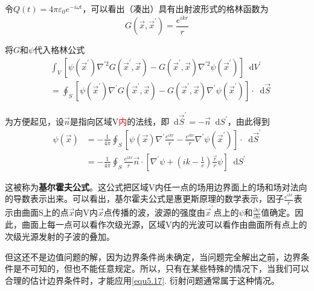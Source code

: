 \documentclass[UTF8]{ctexart}
\newcommand*{\dif}{\mathop{}\!\mathrm{d}}
\newcommand{\red}{\textcolor{red}}
\begin{document}
\noindent 令$Q(t) = 4 \pi \varepsilon_0 e^{-i \omega t}$，可以看出（凑出）具有出射波形式的格林函数为
\begin{equation}
    G(\vec{x},\vec{x}^{\prime}) = \frac{e^{ikr}}{r}
\end{equation}

    将$G$和$\psi$代入格林公式
    \begin{equation}
    \begin{aligned} &\int_{V} \left[\psi\left(\vec{x}^{\prime}\right) \nabla^{\prime 2} G\left(\vec{x}^{\prime}, \vec{x}\right)-G\left(\vec{x}^{\prime}, \vec{x}\right) \nabla^{\prime 2} \psi\left(\vec{x}^{\prime}\right)\right] \dif V^{\prime} \\ &=\oint_{S}\left[\psi\left(\vec{x}^{\prime}\right) \nabla^{\prime} G\left(\vec{x}^{\prime}, \vec{x}\right)-G\left(\vec{x}^{\prime}, \vec{x}\right) \nabla^{\prime} \psi\left(\vec{x}^{\prime}\right)\right] \cdot \dif \vec{S}\end{aligned}
    \end{equation}

\noindent 为方便起见，设$\vec{n}$是指向区域V\red{内}的法线，即$\dif \vec{S}^{\prime} = - \vec{n} \dif S^{\prime}$，由此得到
\begin{equation}
    \begin{aligned}
        \psi(\vec{x}) &= - \frac{1}{4 \pi} \oint_{S} \left[\psi(\vec{x}) \nabla^{\prime} \frac{e^{ikr}}{r} - \frac{e^{ikr}}{r} \nabla^{\prime} \psi(\vec{x}^{\prime})\right] \cdot \dif \vec{S}^{\prime}  \\
        &= - \frac{1}{4 \pi} \oint_S \frac{e^{ikr}}{r} \vec{n} \cdot \left[\nabla^{\prime} \psi +\left(ik-\frac{1}{r}\right) \frac{\vec{r}}{r} \psi\right] \dif S^{\prime}
    \end{aligned}\label{equ5.17}
\end{equation}

    这被称为\textbf{基尔霍夫公式}。这公式把区域V内任一点的场用边界面上的场和场对法向的导数表示出来。可以看出，基尔霍夫公式是惠更斯原理的数学表示，因子$\frac{e^{ikr}}{r}$表示由曲面S上的点$\vec{x}$向V内$\vec{x}$点传播的波，波源的强度由$\vec{x}^{\prime}$点上的$\psi$和$\frac{\partial \psi}{\partial n}$值确定。因此，曲面上每一点可以看作次级光源，区域V内的光波可以看作由曲面所有点上的次级光源发射的子波的叠加。

    但这还不是边值问题的解，因为边界条件尚未确定，当问题完全解出之前，边界条件是不可知的，但也不能任意规定。所以，只有在某些特殊的情况下，当我们可以合理的估计边界条件时，才能应用\autoref{equ5.17}. 衍射问题通常属于这种情况。
\end{document}
